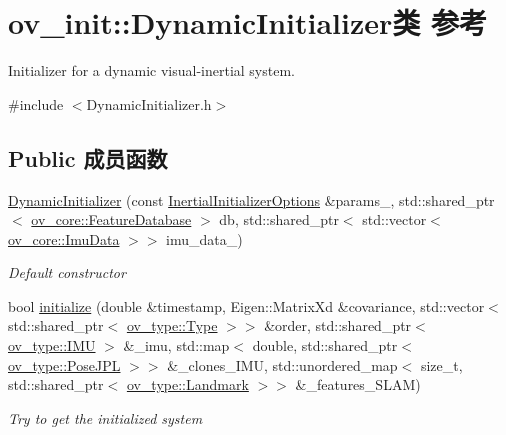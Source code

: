 \hypertarget{classov__init_1_1DynamicInitializer}{}\section{ov\+\_\+init\+:\+:Dynamic\+Initializer类 参考}
\label{classov__init_1_1DynamicInitializer}


Initializer for a dynamic visual-\/inertial system.  




{\ttfamily \#include $<$Dynamic\+Initializer.\+h$>$}

\subsection*{Public 成员函数}
\begin{DoxyCompactItemize}
\item 
\hyperlink{classov__init_1_1DynamicInitializer_a11e592324aedffe4a5b984cf9651a6ab}{Dynamic\+Initializer} (const \hyperlink{structov__init_1_1InertialInitializerOptions}{Inertial\+Initializer\+Options} \&params\+\_\+, std\+::shared\+\_\+ptr$<$ \hyperlink{classov__core_1_1FeatureDatabase}{ov\+\_\+core\+::\+Feature\+Database} $>$ db, std\+::shared\+\_\+ptr$<$ std\+::vector$<$ \hyperlink{structov__core_1_1ImuData}{ov\+\_\+core\+::\+Imu\+Data} $>$$>$ imu\+\_\+data\+\_\+)
\begin{DoxyCompactList}\small\item\em Default constructor \end{DoxyCompactList}\item 
bool \hyperlink{classov__init_1_1DynamicInitializer_aec51b927083a2c5e6fa0c641ca326504}{initialize} (double \&timestamp, Eigen\+::\+Matrix\+Xd \&covariance, std\+::vector$<$ std\+::shared\+\_\+ptr$<$ \hyperlink{classov__type_1_1Type}{ov\+\_\+type\+::\+Type} $>$$>$ \&order, std\+::shared\+\_\+ptr$<$ \hyperlink{classov__type_1_1IMU}{ov\+\_\+type\+::\+I\+MU} $>$ \&\+\_\+imu, std\+::map$<$ double, std\+::shared\+\_\+ptr$<$ \hyperlink{classov__type_1_1PoseJPL}{ov\+\_\+type\+::\+Pose\+J\+PL} $>$$>$ \&\+\_\+clones\+\_\+\+I\+MU, std\+::unordered\+\_\+map$<$ size\+\_\+t, std\+::shared\+\_\+ptr$<$ \hyperlink{classov__type_1_1Landmark}{ov\+\_\+type\+::\+Landmark} $>$$>$ \&\+\_\+features\+\_\+\+S\+L\+AM)
\begin{DoxyCompactList}\small\item\em Try to get the initialized system \end{DoxyCompactList}\end{DoxyCompactItemize}


